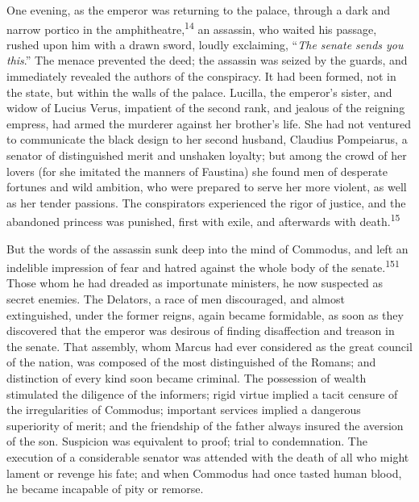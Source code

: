 
One evening, as the emperor was returning to the palace, through
a dark and narrow portico in the amphitheatre,\textsuperscript{14} an assassin,
who waited his passage, rushed upon him with a drawn sword,
loudly exclaiming, “\textit{The senate sends you this}.” The menace
prevented the deed; the assassin was seized by the guards, and
immediately revealed the authors of the conspiracy. It had been
formed, not in the state, but within the walls of the palace.
Lucilla, the emperor’s sister, and widow of Lucius Verus,
impatient of the second rank, and jealous of the reigning
empress, had armed the murderer against her brother’s life. She
had not ventured to communicate the black design to her second
husband, Claudius Pompeiarus, a senator of distinguished merit
and unshaken loyalty; but among the crowd of her lovers (for she
imitated the manners of Faustina) she found men of desperate
fortunes and wild ambition, who were prepared to serve her more
violent, as well as her tender passions. The conspirators
experienced the rigor of justice, and the abandoned princess was
punished, first with exile, and afterwards with death.\textsuperscript{15}



But the words of the assassin sunk deep into the mind of
Commodus, and left an indelible impression of fear and hatred
against the whole body of the senate.\textsuperscript{151} Those whom he had
dreaded as importunate ministers, he now suspected as secret
enemies. The Delators, a race of men discouraged, and almost
extinguished, under the former reigns, again became formidable,
as soon as they discovered that the emperor was desirous of
finding disaffection and treason in the senate. That assembly,
whom Marcus had ever considered as the great council of the
nation, was composed of the most distinguished of the Romans; and
distinction of every kind soon became criminal. The possession of
wealth stimulated the diligence of the informers; rigid virtue
implied a tacit censure of the irregularities of Commodus;
important services implied a dangerous superiority of merit; and
the friendship of the father always insured the aversion of the
son. Suspicion was equivalent to proof; trial to condemnation.
The execution of a considerable senator was attended with the
death of all who might lament or revenge his fate; and when
Commodus had once tasted human blood, he became incapable of pity
or remorse.

